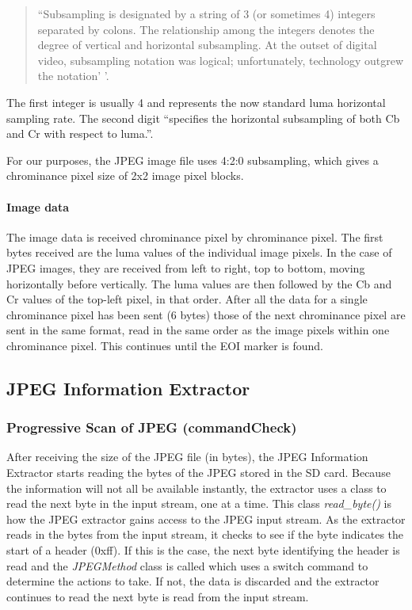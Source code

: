 \begin{quote}
``Subsampling is designated by a string of 3 (or sometimes 4) integers separated by colons. 
The relationship among the integers denotes the degree of vertical and horizontal subsampling. 
At the outset of digital video, subsampling notation was logical; unfortunately, technology outgrew the notation' '\cite{poynton_chroma_subsampling}. 
\end{quote}

The first integer is usually 4 and represents the now standard luma horizontal sampling rate. 
The second digit ``specifies the horizontal subsampling of both Cb and Cr with respect to luma.''\cite{poynton_chroma_subsampling}.

For our purposes, the JPEG image file uses 4:2:0 subsampling, which gives a chrominance pixel size of 2x2 image pixel blocks.

\paragraph{Image data}

The image data is received chrominance pixel by chrominance pixel. 
The first bytes received are the luma values of the individual image pixels. 
In the case of JPEG images, they are received from left to right, top to bottom, moving horizontally before vertically. 
The luma values are then followed by the Cb and Cr values of the top-left pixel, in that order. 
After all the data for a single chrominance pixel has been sent (6 bytes) those of the next chrominance pixel are sent in the same format, 
read in the same order as the image pixels within one chrominance pixel. This continues until the EOI marker is found.


\subsection{JPEG Information Extractor}

\subsubsection{Progressive Scan of JPEG (commandCheck)}

After receiving the size of the JPEG file (in bytes), 
the JPEG Information Extractor starts reading the bytes of the JPEG stored in the SD card. 
Because the information will not all be available instantly, the extractor uses a class to read the next byte in the input stream, one at a time. 
This class \emph{read\_byte()} is how the JPEG extractor gains access to the JPEG input stream. 
As the extractor reads in the bytes from the input stream, it checks to see if the byte indicates the start of a header (0xff). 
If this is the case, the next byte identifying the header is read and 
the \emph{JPEGMethod} class is called which uses a switch command to determine the actions to take. 
If not, the data is discarded and the extractor continues to read the next byte is read from the input stream. 

